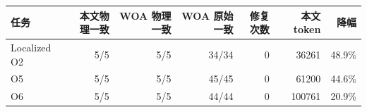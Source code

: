 \begin{tabular}{lrrrrrr}
\toprule
任务 & 本文物理一致 & WOA 物理一致 & WOA 原始一致 & 修复次数 & 本文 token & 降幅 \\
\midrule
Localized O2 & 5/5 & 5/5 & 34/34 & 0 & 36261 & 48.9\% \\
O5 & 5/5 & 5/5 & 45/45 & 0 & 61200 & 44.6\% \\
O6 & 5/5 & 5/5 & 44/44 & 0 & 100761 & 20.9\% \\
\bottomrule
\end{tabular}
